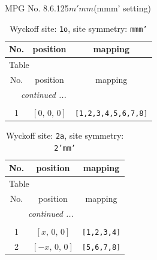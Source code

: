 \documentclass[fleqn,8pt]{jsarticle}
\begin{document}
\setcounter{MaxMatrixCols}{32}

\renewcommand{\tablename}{Table~}
\renewcommand{\figurename}{Figure~}
\begin{center}
\LARGE
MPG No. 8.6.125\quad$m'mm$\quad(mmm' setting)
\end{center}
\renewcommand{\arraystretch}{1.2}
\begin{longtable}{ccc}
\caption{Wyckoff site: {\tt 1o}, site symmetry: {\tt mmm'}}
 \\
 \hline \hline
No. & position & mapping \\ \hline \endfirsthead

\multicolumn{2}{l}{\tablename\ \thetable{}} \\
 \hline \hline
No. & position & mapping \\ \hline \endhead

 \hline \hline
\multicolumn{2}{r}{\footnotesize\it continued ...} \\ \endfoot

 \hline \hline
\multicolumn{2}{r}{} \\ \endlastfoot

1 & $\left[ 0,\, 0,\, 0 \right]$ & {\tt [1,2,3,4,5,6,7,8]} \\
\end{longtable}
\renewcommand{\arraystretch}{1.2}
\begin{longtable}{ccc}
\caption{Wyckoff site: {\tt 2a}, site symmetry: {\tt 2'mm'}}
 \\
 \hline \hline
No. & position & mapping \\ \hline \endfirsthead

\multicolumn{2}{l}{\tablename\ \thetable{}} \\
 \hline \hline
No. & position & mapping \\ \hline \endhead

 \hline \hline
\multicolumn{2}{r}{\footnotesize\it continued ...} \\ \endfoot

 \hline \hline
\multicolumn{2}{r}{} \\ \endlastfoot

1 & $\left[ x,\, 0,\, 0 \right]$ & {\tt [1,2,3,4]} \\ \hline
2 & $\left[ - x,\, 0,\, 0 \right]$ & {\tt [5,6,7,8]} \\
\end{longtable}
\renewcommand{\arraystretch}{1.2}
\end{document}
